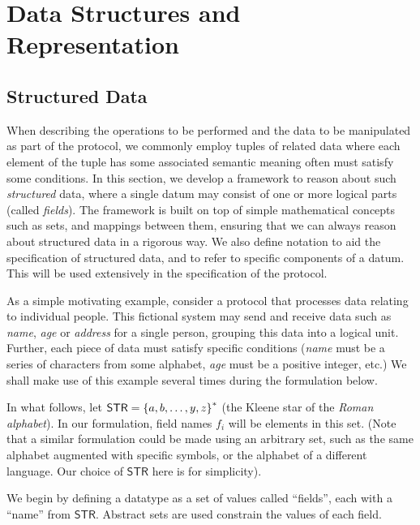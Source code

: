 
\section{Data Structures and Representation}\label{preliminaries:structured-data}

\newcommand{\STR}{\mathsf{STR}}

\subsection{Structured Data}\label{preliminaries:data-types:formulation}

When describing the operations to be performed and the data to be manipulated as part of the protocol, we commonly employ tuples of related data where each element of the tuple has some associated semantic meaning often must satisfy some conditions. In this section, we develop a framework to reason about such \emph{structured} data, where a single datum may consist of one or more logical parts (called \emph{fields}). The framework is built on top of simple mathematical concepts such as sets, and mappings between them, ensuring that we can always reason about structured data in a rigorous way. We also define notation to aid the specification of structured data, and to refer to specific components of a datum. This will be used extensively in the specification of the protocol.

As a simple motivating example, consider a protocol that processes data relating to individual people. This fictional system may send and receive data such as \emph{name}, \emph{age} or \emph{address} for a single person, grouping this data into a logical unit. Further, each piece of data must satisfy specific conditions (\emph{name} must be a series of characters from some alphabet, \emph{age} must be a positive integer, etc.) We shall make use of this example several times during the formulation below.

In what follows, let $\STR = \smallset{a, b, \ldots, y, z}^{*}$ (the Kleene star of the \emph{Roman alphabet}). In our formulation, field names $f_i$ will be elements in this set. (Note that a similar formulation could be made using an arbitrary set, such as the same alphabet augmented with specific symbols, or the alphabet of a different language. Our choice of $\STR{}$ here is for simplicity).

We begin by defining a datatype as a set of values called ``fields'', each with a ``name'' from $\STR$. Abstract sets are used constrain the values of each field.

